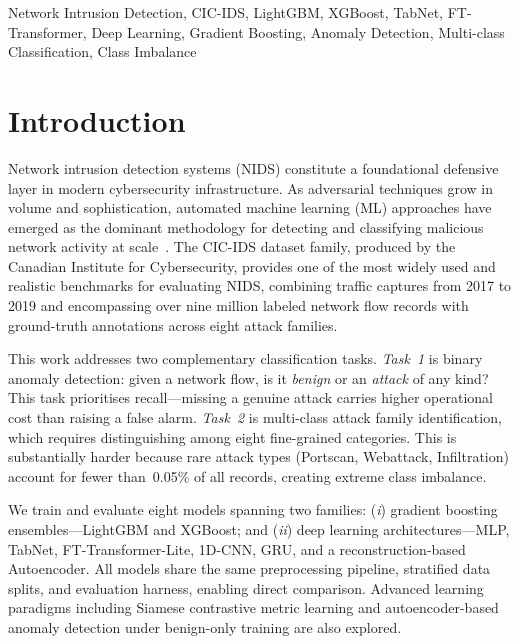 \documentclass[conference]{IEEEtran}
\begin{document}
\begin{IEEEkeywords}
Network Intrusion Detection, CIC-IDS, LightGBM, XGBoost, TabNet,
FT-Transformer, Deep Learning, Gradient Boosting, Anomaly Detection,
Multi-class Classification, Class Imbalance
\end{IEEEkeywords}

\section{Introduction}

Network intrusion detection systems (NIDS) constitute a foundational defensive
layer in modern cybersecurity infrastructure. As adversarial techniques grow
in volume and sophistication, automated machine learning (ML) approaches have
emerged as the dominant methodology for detecting and classifying malicious
network activity at scale~\cite{lashkari2017}.  The CIC-IDS dataset family,
produced by the Canadian Institute for Cybersecurity, provides one of the most
widely used and realistic benchmarks for evaluating NIDS, combining traffic
captures from 2017 to 2019 and encompassing over nine million labeled network
flow records with ground-truth annotations across eight attack families.

This work addresses two complementary classification tasks.  \textit{Task~1}
is binary anomaly detection: given a network flow, is it \textit{benign} or an
\textit{attack} of any kind?  This task prioritises recall—missing a genuine
attack carries higher operational cost than raising a false alarm.
\textit{Task~2} is multi-class attack family identification, which requires
distinguishing among eight fine-grained categories.  This is substantially
harder because rare attack types (Portscan, Webattack, Infiltration) account
for fewer than~0.05\% of all records, creating extreme class imbalance.

We train and evaluate eight models spanning two families: (\textit{i})
gradient boosting ensembles—LightGBM and XGBoost; and (\textit{ii}) deep
learning architectures—MLP, TabNet, FT-Transformer-Lite, 1D-CNN, GRU, and
a reconstruction-based Autoencoder.  All models share the same preprocessing
pipeline, stratified data splits, and evaluation harness, enabling direct
comparison.  Advanced learning paradigms including Siamese contrastive metric
learning and autoencoder-based anomaly detection under benign-only training
are also explored.
\end{document}

